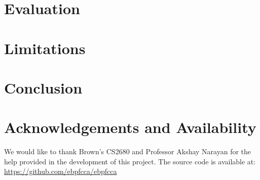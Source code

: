 \section{Evaluation}


\section{Limitations}


\section{Conclusion}


\section{Acknowledgements and Availability}

We would like to thank Brown's CS2680 and Professor Akshay Narayan for the help provided in the development of this project. The source code is available at: \\
\url{https://github.com/ebpfcca/ebpfcca}






